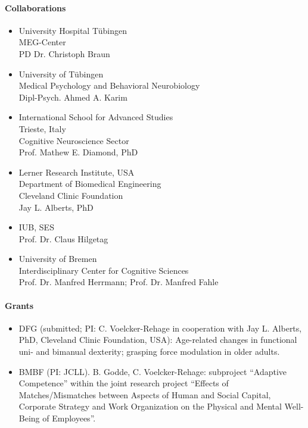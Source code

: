 \enlargethispage*{0.2cm}
\paragraph{Collaborations}
\begin{itemize}
\item University Hospital T\"{u}bingen \\ MEG-Center \\ PD Dr. Christoph Braun 
\item University of T\"{u}bingen \\ Medical Psychology and Behavioral Neurobiology \\ Dipl-Psych. Ahmed A. Karim
\item International School for Advanced Studies \\ Trieste, Italy \\ Cognitive Neuroscience Sector \\ Prof. Mathew E. Diamond, PhD
\item Lerner Research Institute, USA \\ Department of Biomedical Engineering \\ Cleveland Clinic Foundation \\ Jay L. Alberts, PhD
\item IUB, SES \\ Prof. Dr. Claus Hilgetag
\item University of Bremen \\ Interdisciplinary Center for Cognitive Sciences \\ Prof. Dr. Manfred Herrmann; Prof. Dr. Manfred Fahle
\end{itemize}

\begin{bibunit}[apalike]
\nocite{*}
\putbib[profBenGodde1]
\end{bibunit}

\paragraph{Grants}
\begin{itemize}
\item DFG (submitted; PI: C. Voelcker-Rehage in cooperation with Jay L. Alberts, PhD, Cleveland Clinic Foundation, USA): Age-related changes in functional uni- and bimanual dexterity; grasping force modulation in older adults.

\item BMBF (PI: JCLL). B. Godde, C. Voelcker-Rehage: subproject ``Adaptive Competence'' within the joint research project ``Effects of Matches/Mismatches between Aspects of Human and Social Capital, Corporate Strategy and Work Organization on the Physical and Mental Well-Being of Employees''. 
 
\end{itemize}